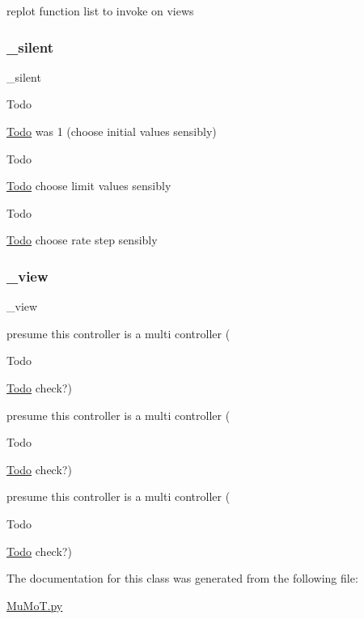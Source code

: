 replot function list to invoke on views 

\mbox{\label{class_mu_mo_t_1_1_mu_mo_tmulti_controller_a909146a3c119c927727c7d533042b184}} 
\subsubsection{\texorpdfstring{\+\_\+silent}{\_silent}}
{\footnotesize\ttfamily \+\_\+silent\hspace{0.3cm}{\ttfamily [private]}}

\begin{DoxyRefDesc}{Todo}
\item[\hyperlink{todo__todo000024}{Todo}]was 1 (choose initial values sensibly) \end{DoxyRefDesc}
\begin{DoxyRefDesc}{Todo}
\item[\hyperlink{todo__todo000025}{Todo}]choose limit values sensibly \end{DoxyRefDesc}
\begin{DoxyRefDesc}{Todo}
\item[\hyperlink{todo__todo000026}{Todo}]choose rate step sensibly \end{DoxyRefDesc}
\mbox{\label{class_mu_mo_t_1_1_mu_mo_tmulti_controller_a27dd8543b5188cdfe40f622d267fe2c5}} 
\subsubsection{\texorpdfstring{\+\_\+view}{\_view}}
{\footnotesize\ttfamily \+\_\+view\hspace{0.3cm}{\ttfamily [private]}}



presume this controller is a multi controller ( 

\begin{DoxyRefDesc}{Todo}
\item[\hyperlink{todo__todo000027}{Todo}]check?) \end{DoxyRefDesc}
presume this controller is a multi controller (\begin{DoxyRefDesc}{Todo}
\item[\hyperlink{todo__todo000028}{Todo}]check?) \end{DoxyRefDesc}
presume this controller is a multi controller (\begin{DoxyRefDesc}{Todo}
\item[\hyperlink{todo__todo000029}{Todo}]check?) \end{DoxyRefDesc}


The documentation for this class was generated from the following file\+:\begin{DoxyCompactItemize}
\item 
\hyperlink{_mu_mo_t_8py}{Mu\+Mo\+T.\+py}\end{DoxyCompactItemize}
